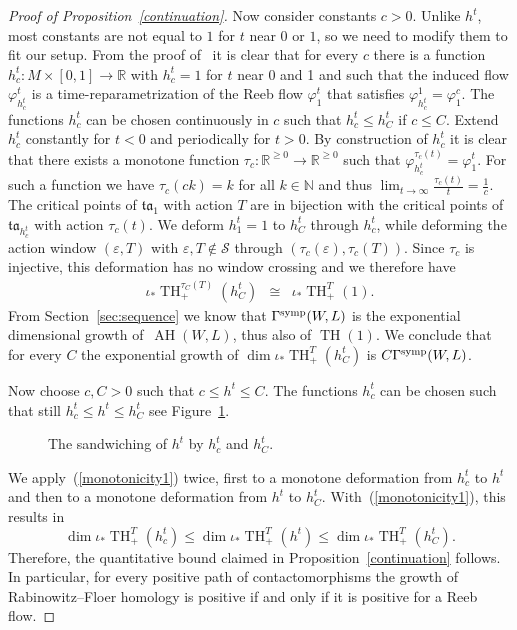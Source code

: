 \documentclass{amsart}
\newcommand{\Scal}{{\mathcal{S}}}
\newcommand{\tacal}{{\mathfrak{ta}}}
\newcommand{\NN}{\mathbb{N}}
\newcommand{\RR}{\mathbb{R}}
\renewcommand{\TH}{\operatorname{TH}}
\newcommand{\AH}{\operatorname{AH}}
\theoremstyle{definition}
\theoremstyle{remark}
\numberwithin{equation}{section}
\begin{document}
\begin{proof}[Proof of Proposition~\ref{continuation}]
Now consider constants $c>0$. Unlike $h^t$, most constants are not equal to $1$ for $t$ near $0$ or $1$, so we need to modify them to fit our setup. From the proof of~\cite[Proposition~6.2]{FLS15} it is clear that for every $c$ there is a function $h_c^t:M\times[0,1]\to\RR$ with $h_c^t=1$ for $t$ near 0 and 1 and such that the induced flow $\varphi_{h_c^t}^t$ is a time-reparametrization of the Reeb flow $\varphi_1^t$ that satisfies $\varphi^1_{h_c^t}=\varphi^c_1$. The functions $h_c^t$ can be chosen continuously in $c$ such that $h_c^t\leq h_C^t$ if $c\leq C$. Extend $h_c^t$ constantly for $t<0$ and periodically for $t>0$. 
By construction of $h_c^t$ it is clear that there exists a monotone function $\tau_c:\RR^{\geq 0}\to\RR^{\geq 0}$ such that $\varphi_{h_c^t}^{\tau_c(t)}=\varphi_{1}^{t}$. For such a function we have $\tau_c(ck)=k$ for all $k\in\NN$ and thus $\lim_{t\to\infty}\frac{\tau_c(t)} t=\frac1c$.
The critical points of $\tacal_{1}$ with action $T$ are in bijection with the critical points of $\tacal_{h_c^t}$ with action $\tau_c(t)$. We deform $h_1^t=1$ to $h_C^t$ through $h_c^t$, while deforming the action window $(\varepsilon,T)$ with $\varepsilon,T\notin\Scal$ through $(\tau_c(\varepsilon),\tau_c(T))$. Since $\tau_c$ is injective, this deformation has no window crossing and we therefore have
\begin{eqnarray*}
	\iota_*\TH_+^{\tau_C(T)}(h_C^t)&\cong&\iota_*\TH_+^{T}(1).
\end{eqnarray*}
From Section~\ref{sec:sequence} we know that $\Gamma^{\rm symp}(W,L)$ is the exponential dimensional growth of~$\AH(W,L)$, thus also of $\TH(1)$. We conclude that for every $C$ the exponential growth of $\dim \iota_*\TH_+^T(h_C^t)$ is $C\Gamma^{\rm symp}(W,L)$.

Now choose $c,C>0$ such that $c\leq h^t\leq C$. The functions $h_c^t$ can be chosen such that still $h_c^t\leq h^t\leq h_C^t$ see Figure~\ref{fig:htsandwich}. 

\begin{figure}[h]
	\caption{The sandwiching of $h^t$ by $h_c^t$ and $h_C^t$.}
	\label{fig:htsandwich}
\end{figure}

We apply~(\ref{monotonicity1}) twice, first to a monotone deformation from $h_c^t$ to $h^t$ and then to a monotone deformation from $h^t$ to $h_C^t$. 
With~(\ref{monotonicity1}), this results in 
$$\dim \iota_*\TH_+^T(h_c^t)\leq\dim \iota_*\TH_+^T(h^t)\leq\dim \iota_*\TH_+^T(h_C^t).$$
Therefore, the quantitative bound claimed in Proposition~\ref{continuation} follows. In particular, for every positive path of contactomorphisms the growth of Rabinowitz--Floer homology is positive if and only if it is positive for a Reeb flow.
\end{proof}
\end{document}
